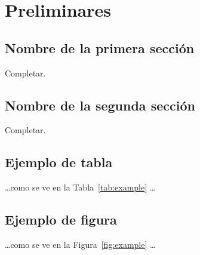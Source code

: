 \chapter{Preliminares}\label{chapter02}

\section{Nombre de la primera sección}

Completar.

\section{Nombre de la segunda sección}

Completar.

\section{Ejemplo de tabla}



\noindent \ldots como se ve en la Tabla~\ref{tab:example} \ldots

\section{Ejemplo de figura}



\noindent \ldots como se ve en la Figura~\ref{fig:example} \ldots

